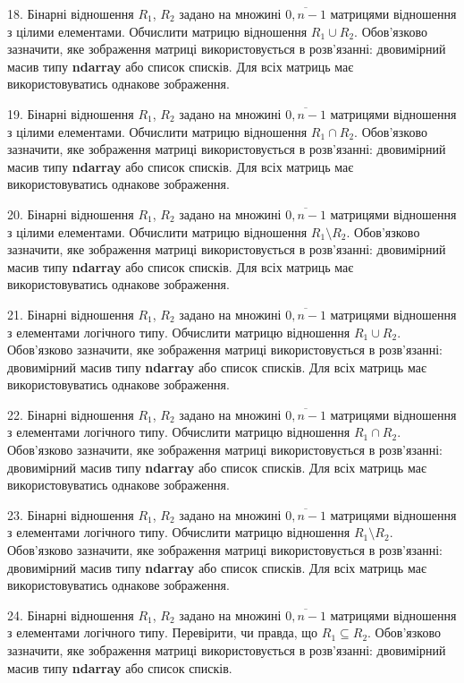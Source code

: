 \documentclass[10pt, ukrainian]{article}
\begin{document}
{\begin {Large}
18. Бінарні відношення $R_1$, $R_2$ задано на множині $\overline{0,n-1}$ матрицями відношення з цілими елементами. Обчислити матрицю відношення $R_1\cup R_2$. Обов'язково зазначити, яке зображення матриці використовується в розв'язанні: двовимірний масив типу \textbf{ndarray} або список списків. Для всіх матриць має використовуватись однакове зображення.

19. Бінарні відношення $R_1$, $R_2$ задано на множині $\overline{0,n-1}$ матрицями відношення з цілими елементами. Обчислити матрицю відношення $R_1\cap R_2$. Обов'язково зазначити, яке зображення матриці використовується в розв'язанні: двовимірний масив типу \textbf{ndarray} або список списків. Для всіх матриць має використовуватись однакове зображення.

20. Бінарні відношення $R_1$, $R_2$ задано на множині $\overline{0,n-1}$ матрицями відношення з цілими елементами. Обчислити матрицю відношення $R_1\setminus R_2$. Обов'язково зазначити, яке зображення матриці використовується в розв'язанні: двовимірний масив типу \textbf{ndarray} або список списків. Для всіх матриць має використовуватись однакове зображення.

21. Бінарні відношення $R_1$, $R_2$ задано на множині $\overline{0,n-1}$ матрицями відношення з елементами логічного типу. Обчислити матрицю відношення $R_1\cup R_2$. Обов'язково зазначити, яке зображення матриці використовується в розв'язанні: двовимірний масив типу \textbf{ndarray} або список списків. Для всіх матриць має використовуватись однакове зображення.

\newpage

22. Бінарні відношення $R_1$, $R_2$ задано на множині $\overline{0,n-1}$ матрицями відношення з елементами логічного типу. Обчислити матрицю відношення $R_1\cap R_2$. Обов'язково зазначити, яке зображення матриці використовується в розв'язанні: двовимірний масив типу \textbf{ndarray} або список списків. Для всіх матриць має використовуватись однакове зображення.

23. Бінарні відношення $R_1$, $R_2$ задано на множині $\overline{0,n-1}$ матрицями відношення з елементами логічного типу. Обчислити матрицю відношення $R_1\setminus R_2$. Обов'язково зазначити, яке зображення матриці використовується в розв'язанні: двовимірний масив типу \textbf{ndarray} або список списків. Для всіх матриць має використовуватись однакове зображення.

24. Бінарні відношення $R_1$, $R_2$ задано на множині $\overline{0,n-1}$ матрицями відношення з елементами логічного типу. Перевірити, чи правда, що  $R_1\subseteq R_2$. Обов'язково зазначити, яке зображення матриці використовується в розв'язанні: двовимірний масив типу \textbf{ndarray} або список списків.


\end{Large}}
\end{document}
